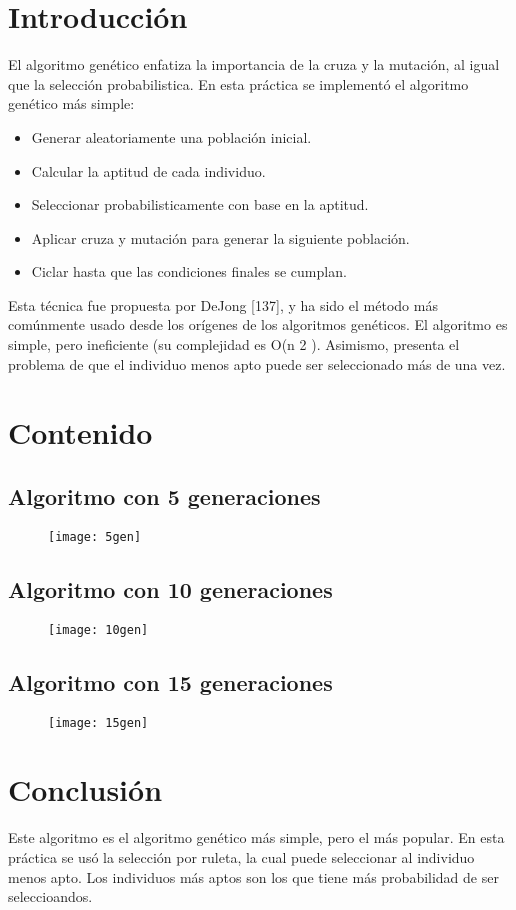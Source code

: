 \documentclass{article}
\begin{document}
\maketitle
\tableofcontents
\section{Introducción}
El algoritmo genético enfatiza la importancia de la cruza y la mutación, al igual que la selección probabilistica.
En esta práctica se implementó el algoritmo genético más simple:
\begin{itemize}
	\item Generar aleatoriamente una población inicial.
	\item Calcular la aptitud de cada individuo.
	\item Seleccionar probabilisticamente con base en la aptitud.
	\item Aplicar cruza y mutación para generar la siguiente población.
	\item Ciclar hasta que las condiciones finales se cumplan.
\end{itemize}
Esta técnica fue propuesta por DeJong [137], y ha sido el método más comúnmente
usado desde los orígenes de los algoritmos genéticos. El algoritmo es simple, pero
ineficiente (su complejidad es O(n 2 ). Asimismo, presenta el problema de que el
individuo menos apto puede ser seleccionado más de una vez.
\newpage
\section{Contenido}
\subsection{Algoritmo con 5 generaciones}
\begin{figure}[h!]
	\centering
	\texttt{[image: 5gen]}
\end{figure}
\newpage
\subsection{Algoritmo con 10 generaciones}
\begin{figure}[h!]
	\centering
	\texttt{[image: 10gen]}
\end{figure}
\subsection{Algoritmo con 15 generaciones}
\begin{figure}[h!]
	\centering
	\texttt{[image: 15gen]}
\end{figure}
\section{Conclusión}
Este algoritmo es el algoritmo genético más simple, pero el más popular. En esta práctica se usó la selección por ruleta, la cual puede seleccionar al individuo menos apto. Los individuos más aptos son los que tiene más probabilidad de ser seleccioandos.
\end{document}
